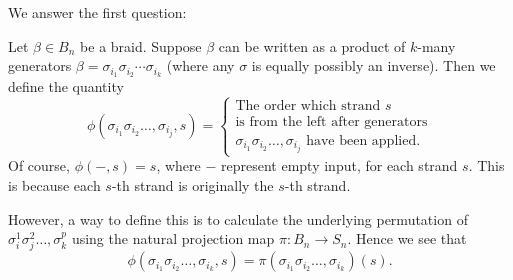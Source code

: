 We answer the first question:
\begin{definition}
    Let $\beta \in B_n$ be a braid. Suppose $\beta$ can be written 
    as a product of $k$-many generators $\beta = \sigma_{i_1}\sigma_{i_2} \cdots \sigma_{i_k}$  
    (where any $\sigma$ is equally possibly an inverse). 
    Then we define the quantity 
    \[
        \phi(\sigma_{i_1}\sigma_{i_2}\dots, \sigma_{i_j}, s)
        = 
        \begin{cases}
            \text{The order which strand }s\\
            \text{is from the left after generators}\\
            \sigma_{i_1}\sigma_{i_2}\dots, \sigma_{i_j}
            \text{ have been applied.}
        \end{cases}
    \]
    Of course, $\phi(-, s) = s$, where $-$ represent empty input,
    for each strand $s$. This is because each $s$-th strand is originally the 
    $s$-th strand.

    However, a way to define this is to calculate the underlying permutation 
    of $\sigma_i^{1}\sigma_j^{2}\dots, \sigma_k^{p}$ using the natural projection 
    map $\pi: B_n \to S_n$. Hence we see that 
    \[
        \phi(\sigma_{i_1}\sigma_{i_2}\dots, \sigma_{i_k}, s)
        = 
        \pi(\sigma_{i_1}\sigma_{i_2}\dots, \sigma_{i_k})(s).
    \]
\end{definition}

